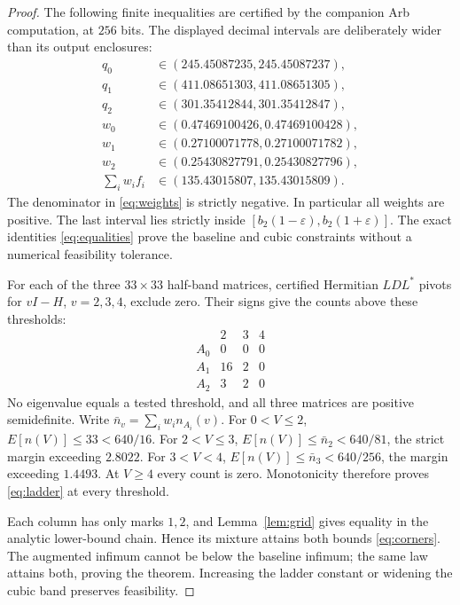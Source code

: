 \documentclass[11pt]{article}
\theoremstyle{definition}\newtheorem{definition}[theorem]{Definition}
\theoremstyle{remark}\newtheorem{remark}[theorem]{Remark}
\begin{document}
\begin{proof}
The following finite inequalities are certified by the companion Arb
computation, at $256$ bits. The displayed decimal intervals are deliberately
wider than its output enclosures:
\begin{align*}
 q_0&\in(245.45087235,245.45087237),\\
 q_1&\in(411.08651303,411.08651305),\\
 q_2&\in(301.35412844,301.35412847),\\
 w_0&\in(0.47469100426,0.47469100428),\\
 w_1&\in(0.27100071778,0.27100071782),\\
 w_2&\in(0.25430827791,0.25430827796),\\
 \sum_iw_if_i&\in(135.43015807,135.43015809).
\end{align*}
The denominator in \eqref{eq:weights} is strictly negative. In particular
all weights are positive. The last interval lies strictly inside
$[b_2(1-\varepsilon),b_2(1+\varepsilon)]$.
The exact identities \eqref{eq:equalities} prove the baseline and cubic
constraints without a numerical feasibility tolerance.

For each of the three $33\times33$ half-band matrices, certified Hermitian
$LDL^*$ pivots for $vI-H$, $v=2,3,4$, exclude zero. Their signs give the
counts above these thresholds:
\[
\begin{array}{c|ccc}
 &2&3&4\\\hline
 A_0&0&0&0\\ A_1&16&2&0\\ A_2&3&2&0
\end{array}
\]
No eigenvalue equals a tested threshold, and all three matrices are positive
semidefinite. Write $\bar n_v=\sum_iw_i n_{A_i}(v)$.
For $0<V\le2$, $E[n(V)]\le33<640/16$.
For $2<V\le3$, $E[n(V)]\le\bar n_2<640/81$, the strict margin exceeding
$2.8022$. For $3<V<4$, $E[n(V)]\le\bar n_3<640/256$, the margin exceeding
$1.4493$. At $V\ge4$ every count is zero. Monotonicity therefore proves
\eqref{eq:ladder} at every threshold.

Each column has only marks $1,2$, and Lemma~\ref{lem:grid} gives equality
in the analytic lower-bound chain. Hence its mixture attains both bounds
\eqref{eq:corners}. The augmented infimum cannot be below the baseline
infimum; the same law attains both, proving the theorem. Increasing the
ladder constant or widening the cubic band preserves feasibility.
\end{proof}
\end{document}
